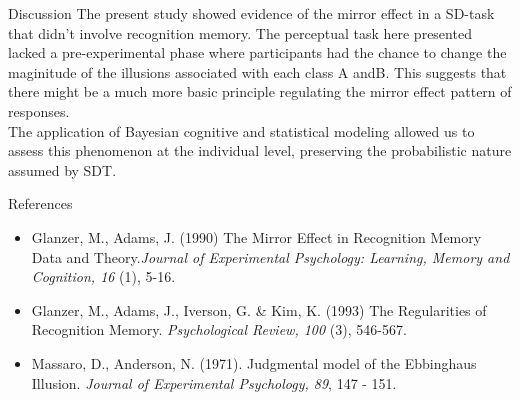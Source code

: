 \documentclass[final]{beamer}
\newlength{\onecolwid}
\begin{document}
\begin{frame}[t]
\begin{columns}[t]
\begin{column}{\onecolwid}
\begin{alertblock}{Discussion}
The present study showed evidence of the mirror effect in a SD-task that didn't involve recognition memory. The perceptual task here presented lacked a pre-experimental phase where participants had the chance to change the maginitude of the illusions associated with each class A andB. This suggests that there might be a much more basic principle regulating the mirror effect pattern of responses.\\
\vspace{0.5cm}
The application of Bayesian cognitive and statistical modeling allowed us to assess this phenomenon at the individual level, preserving the probabilistic nature assumed by SDT.

\end{alertblock}


\begin{alertblock}{References}

\begin{itemize}
\item Glanzer, M., Adams, J. (1990) The Mirror Effect in Recognition Memory \: Data and Theory.\textit{Journal of Experimental Psychology: Learning, Memory and Cognition, 16} (1), 5-16.
\item Glanzer, M., Adams, J., Iverson, G. \& Kim, K. (1993) The Regularities of Recognition Memory. \textit{Psychological Review, 100} (3), 546-567.
\item Massaro, D., Anderson, N. (1971). Judgmental model of the Ebbinghaus Illusion. \textit{Journal of Experimental Psychology, 89}, 147 - 151.
\end{itemize}



\end{alertblock}
\end{column}
\end{columns}
\end{frame}
\end{document}

